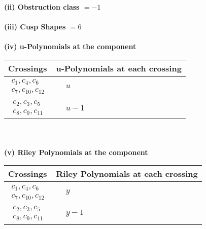 \documentclass[1p]{elsarticle_modified}
\theoremstyle{definition}
\begin{document}
\flushleft \textbf{(ii) Obstruction class $= -1$}\\~\\
\flushleft \textbf{(iii) Cusp Shapes $= 6$}\\~\\
\newpage\renewcommand{\arraystretch}{1}
\flushleft \textbf{(iv) u-Polynomials at the component}\newline \\
\begin{tabular}{m{50pt}|m{274pt}}
Crossings & \hspace{64pt}u-Polynomials at each crossing \\
\hline $$\begin{aligned}c_{1},c_{4},c_{6}\\c_{7},c_{10},c_{12}\end{aligned}$$&$\begin{aligned}
&u
\end{aligned}$\\
\hline $$\begin{aligned}c_{2},c_{3},c_{5}\\c_{8},c_{9},c_{11}\end{aligned}$$&$\begin{aligned}
&u-1
\end{aligned}$\\
\hline
\end{tabular}\\~\\
\newpage\renewcommand{\arraystretch}{1}
\flushleft \textbf{(v) Riley Polynomials at the component}\newline \\
\begin{tabular}{m{50pt}|m{274pt}}
Crossings & \hspace{64pt}Riley Polynomials at each crossing \\
\hline $$\begin{aligned}c_{1},c_{4},c_{6}\\c_{7},c_{10},c_{12}\end{aligned}$$&$\begin{aligned}
&y
\end{aligned}$\\
\hline $$\begin{aligned}c_{2},c_{3},c_{5}\\c_{8},c_{9},c_{11}\end{aligned}$$&$\begin{aligned}
&y-1
\end{aligned}$\\
\hline
\end{tabular}\\~\\
\end{document}
